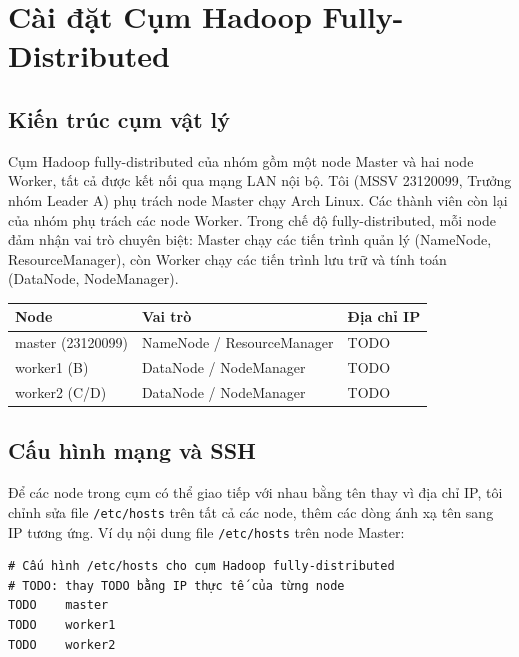\documentclass[12pt,a4paper]{article}
\begin{document}
\section{Cài đặt Cụm Hadoop Fully-Distributed}

\subsection{Kiến trúc cụm vật lý}

Cụm Hadoop fully-distributed của nhóm gồm một node Master và hai node Worker, tất
cả được kết nối qua mạng LAN nội bộ. Tôi (MSSV 23120099, Trưởng nhóm Leader A) phụ
trách node Master chạy Arch Linux. Các thành viên còn lại của nhóm phụ trách các
node Worker. Trong chế độ fully-distributed, mỗi node đảm nhận vai trò chuyên biệt:
Master chạy các tiến trình quản lý (NameNode, ResourceManager), còn Worker chạy các
tiến trình lưu trữ và tính toán (DataNode, NodeManager).

\begin{center}
\begin{tabular}{lll}
\toprule
\textbf{Node} & \textbf{Vai trò} & \textbf{Địa chỉ IP} \\
\midrule
master (23120099) & NameNode / ResourceManager & TODO \\
worker1 (B)       & DataNode / NodeManager     & TODO \\
worker2 (C/D)     & DataNode / NodeManager     & TODO \\
\bottomrule
\end{tabular}
\end{center}

\subsection{Cấu hình mạng và SSH}

Để các node trong cụm có thể giao tiếp với nhau bằng tên thay vì địa chỉ IP, tôi
chỉnh sửa file \texttt{/etc/hosts} trên tất cả các node, thêm các dòng ánh xạ tên
sang IP tương ứng. Ví dụ nội dung file \texttt{/etc/hosts} trên node Master:

\begin{verbatim}
# Cấu hình /etc/hosts cho cụm Hadoop fully-distributed
# TODO: thay TODO bằng IP thực tế của từng node
TODO    master
TODO    worker1
TODO    worker2
\end{verbatim}
\end{document}
